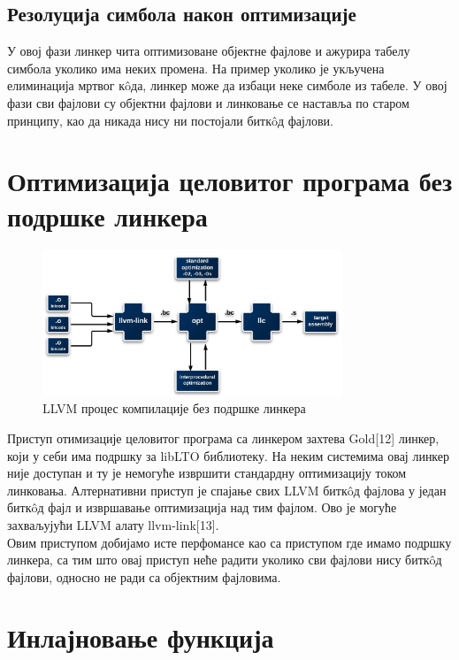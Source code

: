 \documentclass[12pt,oneside]{memoir}
\begin{document}
\subsection{Резолуција симбола након оптимизације}
У овој фази линкер чита оптимизоване објектне фајлове и ажурира табелу симбола уколико 
има неких промена. На пример уколико је укључена елиминација мртвог к\^{o}да,
линкер може да избаци неке симболе из табеле.
У овој фази сви фајлови су објектни фајлови и линковање се наставља
по старом принципу, као да никада нису ни постојали битк\^{o}д фајлови.

\section{Оптимизација целовитог програма без подршке линкера}
\begin{figure}[!ht]
  \centering
  \includegraphics[width=0.8\textwidth]{llvm_link.png}
  \caption{LLVM процес компилације без подршке линкера}
  \label{fig:grafikon}
\end{figure}

Приступ отимизације целовитог програма са линкером захтева Gold[12] линкер,
који у себи има подршку за libLTO библиотеку.
На неким системима овај линкер није доступан и ту је немогуће извршити стандардну
оптимизацију током линковања.
Алтернативни приступ је спајање свих LLVM битк\^{o}д фајлова у један битк\^{o}д фајл
и извршавање оптимизација над тим фајлом.
Ово је могуће захваљујући LLVM алату llvm-link[13].
\\
Овим приступом добијамо исте перфомансе као са приступом где имамо подршку линкера,
са тим што овај приступ неће радити уколико сви фајлови нису  битк\^{o}д фајлови,
односно не ради са објектним фајловима.


\section{Инлајновање функција}
\end{document}
